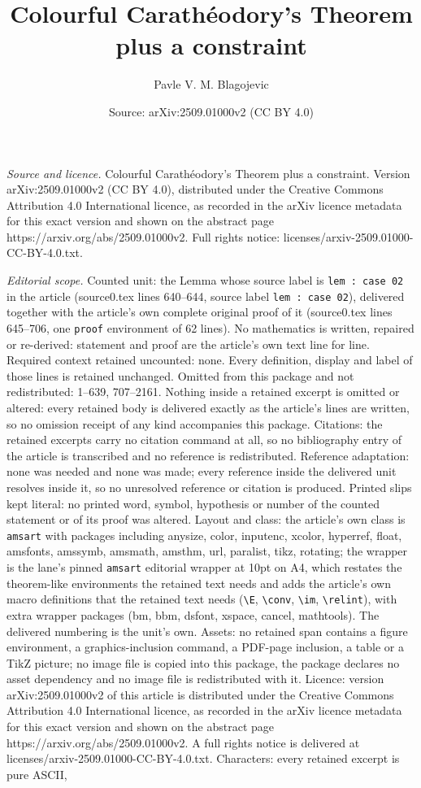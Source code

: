 \documentclass[10pt,a4paper]{amsart}
\title[Colourful Carath\'eodory's Theorem plus a constraint]{Colourful Carath\'eodory's Theorem plus a constraint}
\author{Pavle V. M. Blagojevic}
\date{Source: arXiv:2509.01000v2 (CC BY 4.0)}
\begin{document}
\maketitle

\noindent\emph{Source and licence.} Colourful Carath\'eodory's Theorem plus a constraint. Version arXiv:2509.01000v2 (CC BY 4.0), distributed under the Creative Commons Attribution 4.0 International licence, as recorded in the arXiv licence metadata for this exact version and shown on the abstract page https://arxiv.org/abs/2509.01000v2. Full rights notice: licenses/arxiv-2509.01000-CC-BY-4.0.txt.\par\smallskip

\noindent\textit{Editorial scope.} Counted unit: the Lemma whose source label is \texttt{lem :  case 02} in the article (source0.tex lines 640--644, source label \texttt{lem :  case 02}), delivered together with the article's own complete original proof of it (source0.tex lines 645--706, one \texttt{proof} environment of 62 lines). No mathematics is written, repaired or re-derived: statement and proof are the article's own text line for line. Required context retained uncounted: none. Every definition, display and label of those lines is retained unchanged. Omitted from this package and not redistributed: 1--639, 707--2161. Nothing inside a retained excerpt is omitted or altered: every retained body is delivered exactly as the article's lines are written, so no omission receipt of any kind accompanies this package. Citations: the retained excerpts carry no citation command at all, so no bibliography entry of the article is transcribed and no reference is redistributed. Reference adaptation: none was needed and none was made; every reference inside the delivered unit resolves inside it, so no unresolved reference or citation is produced. Printed slips kept literal: no printed word, symbol, hypothesis or number of the counted statement or of its proof was altered. Layout and class: the article's own class is \texttt{amsart} with packages including anysize, color, inputenc, xcolor, hyperref, float, amsfonts, amssymb, amsmath, amsthm, url, paralist, tikz, rotating; the wrapper is the lane's pinned \texttt{amsart} editorial wrapper at 10pt on A4, which restates the theorem-like environments the retained text needs and adds the article's own macro definitions that the retained text needs (\texttt{\textbackslash E}, \texttt{\textbackslash conv}, \texttt{\textbackslash im}, \texttt{\textbackslash relint}), with extra wrapper packages (bm, bbm, dsfont, xspace, cancel, mathtools). The delivered numbering is the unit's own. Assets: no retained span contains a figure environment, a graphics-inclusion command, a PDF-page inclusion, a table or a TikZ picture; no image file is copied into this package, the package declares no asset dependency and no image file is redistributed with it. Licence: version arXiv:2509.01000v2 of this article is distributed under the Creative Commons Attribution 4.0 International licence, as recorded in the arXiv licence metadata for this exact version and shown on the abstract page https://arxiv.org/abs/2509.01000v2. A full rights notice is delivered at licenses/arxiv-2509.01000-CC-BY-4.0.txt. Characters: every retained excerpt is pure ASCII, 
\end{document}
